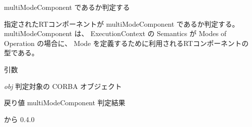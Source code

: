 multiModeComponent であるか判定する 

指定されたRTコンポーネントが multiModeComponent であるか判定する。 multiModeComponent は、 ExecutionContext の Semantics が Modes of Operation の場合に、 Mode を定義するために利用されるRTコンポーネントの型である。


\begin{DoxyParams}{引数}
\item[{\em obj}]判定対象の CORBA オブジェクト\end{DoxyParams}
\begin{DoxyReturn}{戻り値}
multiModeComponent 判定結果
\end{DoxyReturn}
\begin{DoxySince}{から}
0.4.0 
\end{DoxySince}
